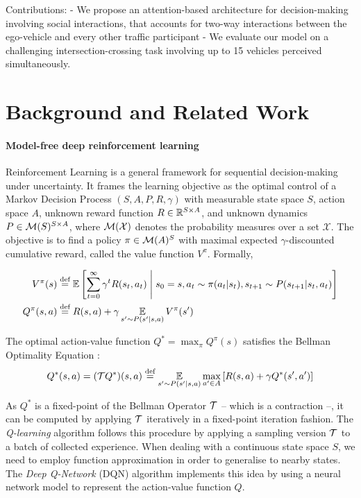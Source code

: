 \documentclass{article}
\begin{document}
Contributions:
- We propose an attention-based architecture for decision-making involving social interactions, that accounts for two-way interactions between the ego-vehicle and every other traffic participant
- We evaluate our model on a challenging intersection-crossing task involving up to 15 vehicles perceived simultaneously.

\section{Background and Related Work}

\paragraph{Model-free deep reinforcement learning} Reinforcement Learning is a general framework for sequential decision-making under uncertainty. It frames the learning objective as the optimal control of a Markov Decision Process $(S, A, P, R, \gamma)$ with measurable state space $S$, action space $A$, unknown reward function $R\in\mathbb{R}^{S \times A}$, and unknown dynamics $P\in \mathcal{M}(S)^{S \times A}$, where $\mathcal{M}(\mathcal{X})$ denotes the probability measures over a set $\mathcal{X}$. The objective is to find a policy $\pi\in\mathcal{M}(A)^S$ with maximal expected $\gamma$-discounted cumulative reward, called the value function $V^\pi$. Formally,

\begin{align*}
V^\pi(s) &\eqdef \expectedvalue\left[\sum_{t=0}^\infty \gamma^t R(s_t, a_t)\condbar s_0=s, a_t\sim \pi(a_t|s_t), s_{t+1}\sim P(s_{t+1}|s_t, a_t)\right]\\
Q^\pi(s, a) &\eqdef R(s, a) + \gamma \expectedvalueover{s'\sim P(s'|s, a)} V^\pi(s')
\end{align*}

The optimal action-value function $Q^* =  \max_\pi Q^\pi(s)$ satisfies the Bellman Optimality Equation \citep{bellman}:
\begin{equation*}
Q^*(s, a) = (\cT Q^*) (s, a) \eqdef \expectedvalueover{s'\sim P(s'|s, a)} \max_{a'\in A} \left[R(s, a) + \gamma Q^*(s', a')\right]
\end{equation*}

As $Q^*$ is a fixed-point of the Bellman Operator $\mathcal{T}$ -- which is a contraction --, it can be computed by applying $\mathcal{T}$ iteratively in a fixed-point iteration fashion. The \emph{Q-learning} algorithm \citep{Watkins} follows this procedure by applying a sampling version $\mathcal{T}$ to a batch of collected experience. When dealing with a continuous state space $S$, we need to employ function approximation in order to generalise to nearby states. The \emph{Deep Q-Network} (DQN) algorithm \citep{Mnih} implements this idea by using a neural network model to represent the action-value function $Q$.
\end{document}
